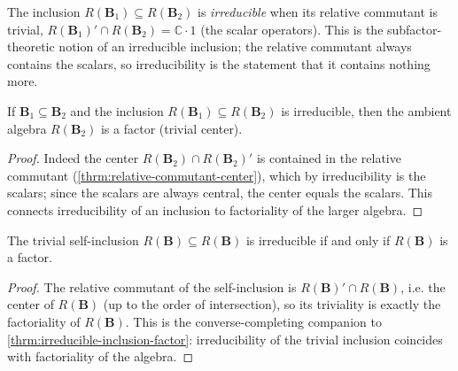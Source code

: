 \begin{definition}
    \label{def:irreducible-inclusion}
    \leanok
    The inclusion $R(\mathbf{B}_1) \subseteq R(\mathbf{B}_2)$ is \emph{irreducible} when its relative commutant is trivial, $R(\mathbf{B}_1)' \cap R(\mathbf{B}_2) = \mathbb{C}\cdot 1$ (the scalar operators). This is the subfactor-theoretic notion of an irreducible inclusion; the relative commutant always contains the scalars, so irreducibility is the statement that it contains nothing more.
\end{definition}

\begin{theorem}
    \label{thrm:irreducible-inclusion-factor}
    \leanok
    If $\mathbf{B}_1 \subseteq \mathbf{B}_2$ and the inclusion $R(\mathbf{B}_1) \subseteq R(\mathbf{B}_2)$ is irreducible, then the ambient algebra $R(\mathbf{B}_2)$ is a factor (trivial center).
\end{theorem}
\begin{proof}
    \leanok
    Indeed the center $R(\mathbf{B}_2) \cap R(\mathbf{B}_2)'$ is contained in the relative commutant (\ref{thrm:relative-commutant-center}), which by irreducibility is the scalars; since the scalars are always central, the center equals the scalars. This connects irreducibility of an inclusion to factoriality of the larger algebra.
\end{proof}

\begin{theorem}
    \label{thrm:self-inclusion-factor}
    \leanok
    The trivial self-inclusion $R(\mathbf{B}) \subseteq R(\mathbf{B})$ is irreducible if and only if $R(\mathbf{B})$ is a factor.
\end{theorem}
\begin{proof}
    \leanok
    The relative commutant of the self-inclusion is $R(\mathbf{B})' \cap R(\mathbf{B})$, i.e. the center of $R(\mathbf{B})$ (up to the order of intersection), so its triviality is exactly the factoriality of $R(\mathbf{B})$. This is the converse-completing companion to \ref{thrm:irreducible-inclusion-factor}: irreducibility of the trivial inclusion coincides with factoriality of the algebra.
\end{proof}


